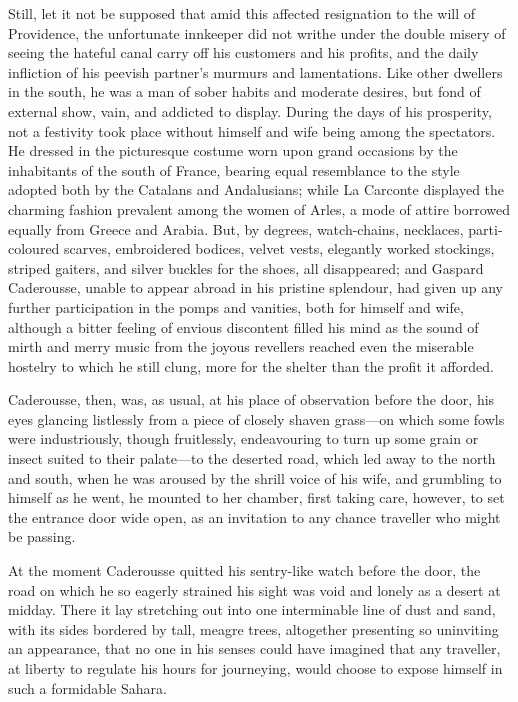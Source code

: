  Still, let it not be supposed that amid this affected resignation to the will of Providence, the unfortunate innkeeper did not writhe under the double misery of seeing the hateful canal carry off his customers and his profits, and the daily infliction of his peevish partner's murmurs and lamentations.  Like other dwellers in the south, he was a man of sober habits and moderate desires, but fond of external show, vain, and addicted to display. During the days of his prosperity, not a festivity took place without himself and wife being among the spectators. He dressed in the picturesque costume worn upon grand occasions by the inhabitants of the south of France, bearing equal resemblance to the style adopted both by the Catalans and Andalusians; while La Carconte displayed the charming fashion prevalent among the women of Arles, a mode of attire borrowed equally from Greece and Arabia. But, by degrees, watch-chains, necklaces, parti-coloured scarves, embroidered bodices, velvet vests, elegantly worked stockings, striped gaiters, and silver buckles for the shoes, all disappeared; and Gaspard Caderousse, unable to appear abroad in his pristine splendour, had given up any further participation in the pomps and vanities, both for himself and wife, although a bitter feeling of envious discontent filled his mind as the sound of mirth and merry music from the joyous revellers reached even the miserable hostelry to which he still clung, more for the shelter than the profit it afforded. 

 Caderousse, then, was, as usual, at his place of observation before the door, his eyes glancing listlessly from a piece of closely shaven grass—on which some fowls were industriously, though fruitlessly, endeavouring to turn up some grain or insect suited to their palate—to the deserted road, which led away to the north and south, when he was aroused by the shrill voice of his wife, and grumbling to himself as he went, he mounted to her chamber, first taking care, however, to set the entrance door wide open, as an invitation to any chance traveller who might be passing. 

 At the moment Caderousse quitted his sentry-like watch before the door, the road on which he so eagerly strained his sight was void and lonely as a desert at midday. There it lay stretching out into one interminable line of dust and sand, with its sides bordered by tall, meagre trees, altogether presenting so uninviting an appearance, that no one in his senses could have imagined that any traveller, at liberty to regulate his hours for journeying, would choose to expose himself in such a formidable Sahara. 

